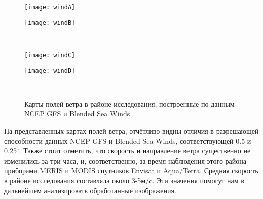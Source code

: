 \begin{figure}[H]
   	\centering
	\begin{minipage}{.47\textwidth}
	    \subcaptionbox{\label{fig:windA}}
		{\texttt{[image: windA]}}
	\end{minipage}
	\hfill
	\begin{minipage}{.47\textwidth}
	    \subcaptionbox{\label{fig:windB}}
		{\texttt{[image: windB]}}
	\end{minipage}
	\\
	\begin{minipage}{.47\textwidth}
	    \subcaptionbox{\label{fig:windC}}
		{\texttt{[image: windC]}}
	\end{minipage}
	\hfill
	\begin{minipage}{.47\textwidth}
	    \subcaptionbox{\label{fig:windD}}
		{\texttt{[image: windD]}}
	\end{minipage}
    \\
    \caption{Карты полей ветра в районе исследования, построенные по данным NCEP GFS и Blended Sea Winds}
    \label{fig:wind}
\end{figure}

На представленных картах полей ветра, отчётливо видны отличия в разрешающей способности данных NCEP GFS и Blended Sea Winds, соответствующей 0.5 и 0.25${}^\circ$. Также стоит отметить, что скорость и направление ветра существенно не изменились за три часа, и, соответственно, за время наблюдения этого района приборами MERIS и MODIS спутников Envisat и Aqua/Terra. Средняя скорость в районе исследования составляла около 3-5м/c. Эти значения помогут нам в дальнейшем анализировать обработанные изображения.

